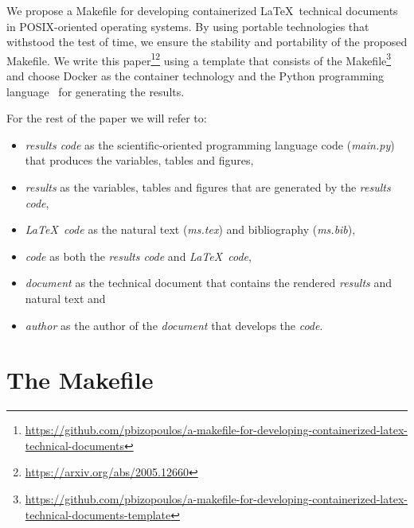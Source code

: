 \documentclass[journal]{IEEEtran}
\begin{document}
We propose a Makefile for developing containerized \LaTeX\ technical documents in POSIX-oriented operating systems.
By using portable technologies that withstood the test of time, we ensure the stability and portability of the proposed Makefile.
We write this paper\footnote{\url{https://github.com/pbizopoulos/a-makefile-for-developing-containerized-latex-technical-documents}}\footnote{\url{https://arxiv.org/abs/2005.12660}} using a template that consists of the Makefile\footnote{\url{https://github.com/pbizopoulos/a-makefile-for-developing-containerized-latex-technical-documents-template}} and choose Docker as the container technology and the Python programming language~\cite{van2007python} for generating the results.

For the rest of the paper we will refer to:
\begin{itemize}
	\item \textit{results code} as the scientific-oriented programming language code (\textit{main.py}) that produces the variables, tables and figures,
	\item \textit{results} as the variables, tables and figures that are generated by the \textit{results code},
	\item \textit{\LaTeX\ code} as the natural text (\textit{ms.tex}) and bibliography (\textit{ms.bib}),
	\item \textit{code} as both the \textit{results code} and \textit{\LaTeX\ code},
	\item \textit{document} as the technical document that contains the rendered \textit{results} and natural text and
	\item \textit{author} as the author of the \textit{document} that develops the \textit{code}.
\end{itemize}

\section{The Makefile}
\end{document}
